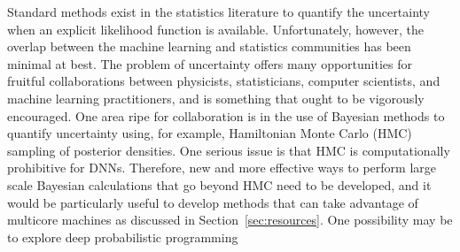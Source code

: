 Standard methods exist in the statistics literature to quantify the uncertainty when an explicit likelihood function is available. Unfortunately, however, the overlap between the machine learning and statistics communities has been minimal at best.
The problem of uncertainty offers many opportunities for fruitful collaborations between physicists, statisticians, computer scientists, and machine learning practitioners, and is something that ought to be vigorously encouraged.
One area ripe for collaboration is in the use of Bayesian methods to quantify uncertainty using, for example, Hamiltonian Monte Carlo (HMC) sampling of posterior densities. One serious issue is that HMC is computationally prohibitive for DNNs. Therefore, new and more effective ways to perform large scale Bayesian calculations that go beyond HMC need to be developed, and it would be particularly useful to develop methods that can take advantage of multicore machines as discussed in Section~\ref{sec:resources}.
One possibility may be to explore deep probabilistic programming ~\cite{2017arXiv170103757T}




